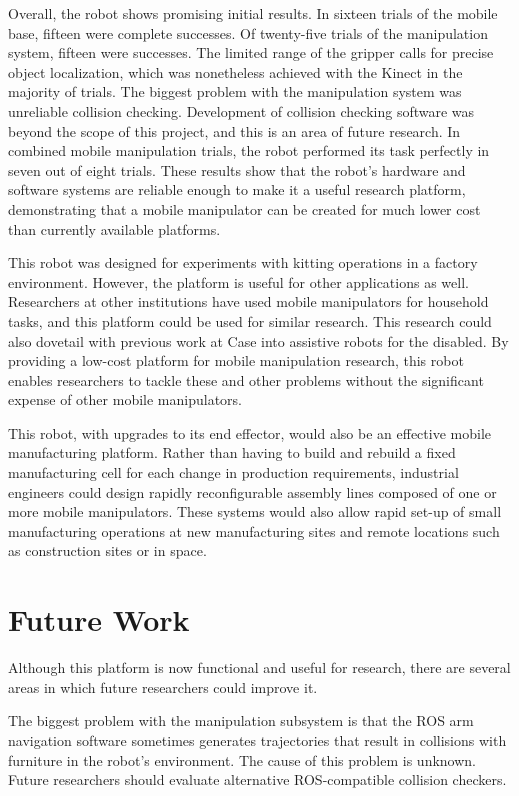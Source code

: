 \documentclass[]{cwru} %
\begin{document}
Overall, the robot shows promising initial results. In sixteen trials of
the mobile base, fifteen were complete successes. Of twenty-five trials
of the manipulation system, fifteen were successes. The limited range of
the gripper calls for precise object localization, which was nonetheless
achieved with the Kinect in the majority of trials. The biggest problem
with the manipulation system was unreliable collision checking.
Development of collision checking software was beyond the scope of this
project, and this is an area of future research. In combined mobile
manipulation trials, the robot performed its task perfectly in seven out
of eight trials. These results show that the robot's hardware and
software systems are reliable enough to make it a useful research
platform, demonstrating that a mobile manipulator can be created for
much lower cost than currently available platforms.

This robot was designed for experiments with kitting operations in a
factory environment. However, the platform is useful for other
applications as well. Researchers at other institutions have used mobile
manipulators for household tasks, and this platform could be used for
similar research. This research could also dovetail with previous work
at Case into assistive robots for the disabled. By providing a low-cost
platform for mobile manipulation research, this robot enables
researchers to tackle these and other problems without the significant
expense of other mobile manipulators.

This robot, with upgrades to its end effector, would also be an
effective mobile manufacturing platform. Rather than having to build and
rebuild a fixed manufacturing cell for each change in production
requirements, industrial engineers could design rapidly reconfigurable
assembly lines composed of one or more mobile manipulators. These
systems would also allow rapid set-up of small manufacturing operations
at new manufacturing sites and remote locations such as construction
sites or in space.

\chapter{Future Work}
\label{future-work}

Although this platform is now functional and useful for research, there
are several areas in which future researchers could improve it.

The biggest problem with the manipulation subsystem is that the ROS arm
navigation software sometimes generates trajectories that result in
collisions with furniture in the robot's environment. The cause of this
problem is unknown. Future researchers should evaluate alternative
ROS-compatible collision checkers.
\end{document}
